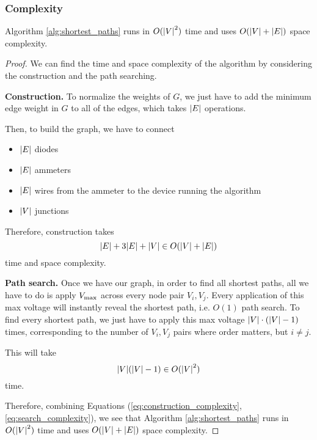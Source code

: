 \subsubsection{Complexity}
\begin{theorem}
  Algorithm \ref{alg:shortest_paths} runs in $O(\abs{V}^2)$ time and uses $O(\abs{V} + \abs{E})$ space complexity.
\end{theorem}
\begin{proof}
  We can find the time and space complexity of the algorithm by considering
  the construction and the path searching.

  \textbf{Construction.} To normalize the weights of $G$, we just have to add
  the minimum edge weight in $G$ to all of the edges, which takes $\abs{E}$
  operations.

  Then, to build the graph, we have to connect
  \begin{itemize}
    \item $\abs{E}$ diodes
    \item $\abs{E}$ ammeters
    \item $\abs{E}$ wires from the ammeter to the device running the algorithm
    \item $\abs{V}$ junctions
  \end{itemize}

  Therefore, construction takes
  \begin{equation}
    \abs{E} + 3\abs{E} + \abs{V} \in O(\abs{V} + \abs{E})
    \label{eq:construction_complexity}
  \end{equation}
  time and space complexity.

  \textbf{Path search.} Once we have our graph, in order to find all shortest
  paths, all we have to do is apply $V_\text{max}$ across every node pair $V_i,
    V_j$. Every application of this max voltage will instantly reveal the
  shortest path, i.e. $O(1)$ path search. To find every shortest path, we
  just have to apply this max voltage $\abs{V} \cdot (\abs{V}-1)$ times,
  corresponding to the number of $V_i, V_j$ pairs where order matters, but $i
    \neq j$.

  This will take
  \begin{equation}
    \abs{V}(\abs{V} - 1) \in O(\abs{V}^2)
    \label{eq:search_complexity}
  \end{equation}
  time.

  Therefore, combining Equations (\ref{eq:construction_complexity},
  \ref{eq:search_complexity}), we see that Algorithm \ref{alg:shortest_paths}
  runs in $O(\abs{V}^2)$ time and uses $O(\abs{V} + \abs{E})$ space
  complexity.
\end{proof}
